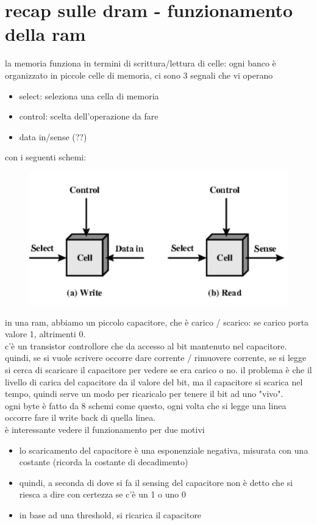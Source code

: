 \documentclass[12pt, oneside]{extbook} %
\begin{document}
\section{recap sulle dram - funzionamento della ram}
la memoria funziona in termini di scrittura/lettura di celle: ogni banco è organizzato in piccole celle di memoria, ci sono 3 segnali che vi operano
\begin{itemize}
\item select: seleziona una cella di memoria
\item control: scelta dell'operazione da fare
\item data in/sense (??)
\end{itemize}
con i seguenti schemi:\\
\begin{figure}[!h]
	\includegraphics[scale=0.4]{immagini/accesso_cella_memoria.png}
\end{figure}
in una ram, abbiamo un piccolo capacitore, che è carico / scarico: se carico porta valore 1, altrimenti 0.\\c'è un transistor controllore che da accesso al bit mantenuto nel capacitore. quindi, se si vuole scrivere occorre dare corrente / rimuovere corrente, se si legge si cerca di scaricare il capacitore per vedere se era carico o no. il problema è che il livello di carica del capacitore da il valore del bit, ma il capacitore si scarica nel tempo, quindi serve un modo per ricaricalo per tenere il bit ad uno "vivo".\\ ogni byte è fatto da 8 schemi come questo, ogni volta che si legge una linea occorre fare il write back di quella linea.\\ è interessante vedere il funzionamento per due motivi
\begin{itemize}
\item lo scaricamento del capacitore è una esponenziale negativa, misurata con una costante (ricorda la costante di decadimento)
\item quindi, a seconda di dove si fa il sensing del capacitore non è detto che si riesca a dire con certezza se c'è un 1 o uno 0
\item in base ad una threshold, si ricarica il capacitore
\end{itemize}
\end{document}
